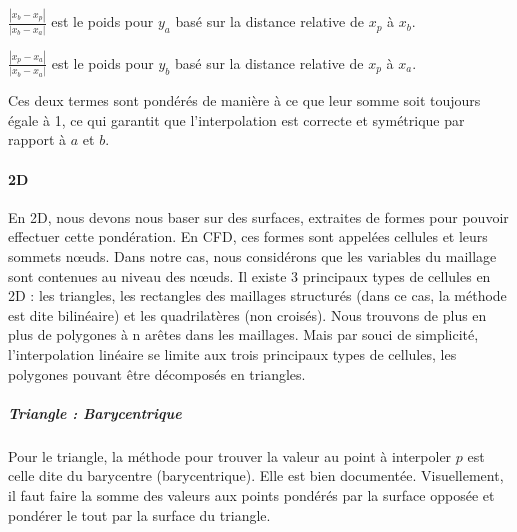         \( \frac{|x_b - x_p|}{|x_b - x_a|} \) est le poids pour \( y_a \) basé sur la distance relative de \( x_p \) à \( x_b \).

        \( \frac{|x_p - x_a|}{|x_b - x_a|} \) est le poids pour \( y_b \) basé sur la distance relative de \( x_p \) à \( x_a \).\vspace{0.5cm}

Ces deux termes sont pondérés de manière à ce que leur somme soit toujours égale à 1, ce
qui garantit que l'interpolation est correcte et symétrique par rapport à \( a \) et \( b \).\vspace{0.5cm}

\vspace{-0.5cm}

\paragraph{2D}
\phantom{-}

En 2D, nous devons nous baser sur des surfaces, extraites de formes pour pouvoir effectuer cette pondération. En CFD, ces formes sont appelées cellules et leurs sommets nœuds. Dans notre cas, nous considérons que les variables du maillage sont contenues au niveau des nœuds. 
Il existe 3 principaux types de cellules en 2D : les triangles, les rectangles des maillages structurés (dans ce cas, la méthode est dite bilinéaire) et les quadrilatères (non croisés).
Nous trouvons de plus en plus de polygones à n arêtes dans les maillages. Mais par souci de simplicité, l'interpolation linéaire se limite aux trois principaux types de cellules, les polygones pouvant être décomposés en triangles. %

\subparagraph{Triangle : Barycentrique}

Pour le triangle, la méthode pour trouver la valeur au point à interpoler \( p \) est celle dite du barycentre (barycentrique).
Elle est bien documentée.
Visuellement, il faut faire la somme des valeurs aux points pondérés par la surface opposée et pondérer le tout par la surface du triangle.

